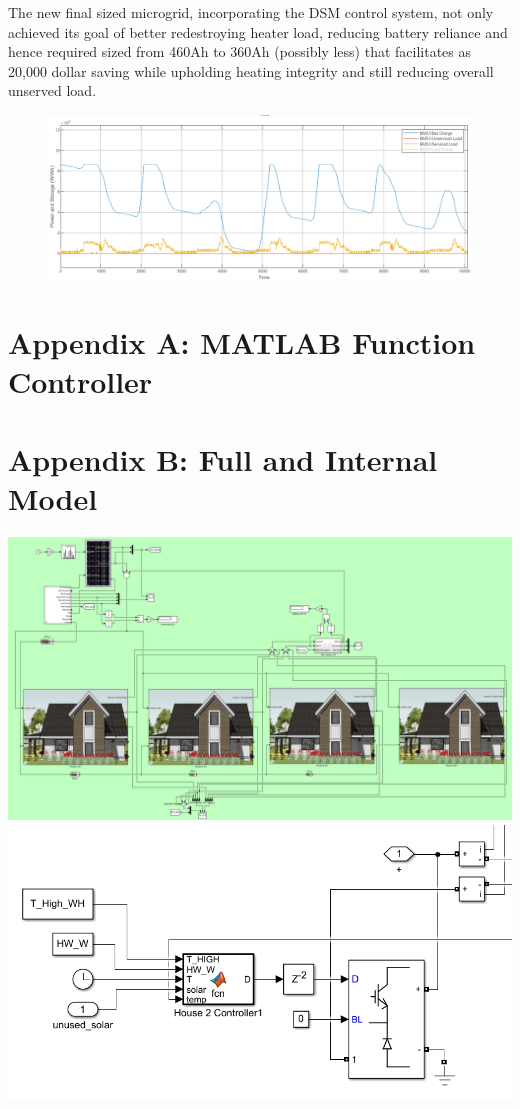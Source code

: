 \documentclass[11pt]{article}
\begin{document}
The new final sized microgrid, incorporating the DSM control system, not only achieved its goal of better redestroying heater load, reducing battery reliance and hence required sized from 460Ah to 360Ah (possibly less) that facilitates as 20,000 dollar saving while upholding heating integrity and still reducing overall unserved load.

\begin{figure}[h!]
    \centering
    \includegraphics[width=\textwidth]{inc/controlled_charge.png}
    \caption{}
    \label{fig:}
\end{figure}

\newpage
\section{Appendix A: MATLAB Function Controller}
\label{ap:matlab}


\section{Appendix B: Full and Internal Model}
\label{ap:model}
    \includegraphics[width=\textwidth]{inc/uGrid_model.png}
    \includegraphics[width=\textwidth]{inc/controller_model.png}

\newpage
\nocite{*}


\end{document}
